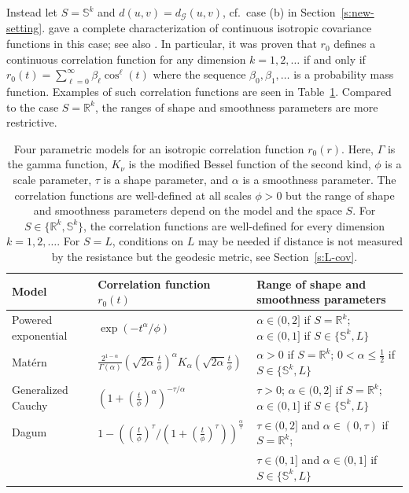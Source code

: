 \documentclass[alpha-refs]{wiley-article}
\begin{document}
Instead let $S=\mathbb S^k$ and $d(u,v)=d_\mathcal{G}(u,v)$, cf.\ case (b) in Section~\ref{s:new-setting}. \citet{Schoenberg} gave a complete characterization of continuous isotropic covariance functions in this case; see also \citet{gneiting2013strictly}. In particular, it was proven that $r_0$ defines a continuous correlation function for any dimension $k=1,2,\ldots$ if and only if $r_0(t)=\sum_{\ell=0}^\infty\beta_\ell\cos^\ell(t)$ where the sequence $\beta_0,\beta_1,\ldots$ is a probability mass function. Examples of such correlation functions are seen in Table~\ref{tab:covariances-sphere}. Compared to the case $S=\mathbb R^k$, the ranges of shape and smoothness parameters are more restrictive.


\begin{table}
    \centering
    \begin{tabular}{l||l|l}
        Model & Correlation function $r_0(t)$ & Range of shape and smoothness parameters\\
        \hline
        \hline
        Powered exponential & $\exp\left(-t^\alpha/\phi\right)$ & $\alpha\in(0,2]$ if $S=\mathbb R^k$; $\alpha\in(0,1]$ if $S\in\{\mathbb S^k,L\}$\\
        Mat{\'e}rn & $\frac{2^{1-\alpha}}{\Gamma(\alpha)}\left( \sqrt{2\alpha}\frac{t}{\phi} \right)^{\alpha} K_{\alpha}\left(\sqrt{2\alpha}\frac{t}{\phi}\right)$ &  $\alpha>0$  if $S=\mathbb R^k$; $0< \alpha\leq \frac{1}{2}$ if $S\in\{\mathbb S^k,L\}$\\
        Generalized Cauchy & $(1 + (\frac{t}{\phi})^{\alpha})^{-\tau/\alpha}$ & $\tau > 0$; $\alpha \in (0,2]$ if $S=\mathbb R^k$; $\alpha \in (0,1]$ if $S\in\{\mathbb S^k,L\}$\\
        Dagum & $1 - ((\frac{t}{\phi})^{\tau}/(1+(\frac{t}{\phi})^{\tau}))^{\frac{\alpha}{\tau}}$ & $\tau \in (0,2]$ and $\alpha \in (0,\tau)$ if $S=\mathbb R^k$; \\
        & & $\tau \in (0,1]$ and $\alpha \in (0,1]$ if $S\in\{\mathbb S^k,L\}$
    \end{tabular}
    \caption{Four parametric models for an isotropic correlation function $r_0(r)$. Here, $\Gamma$ is the gamma function, $K_{\nu}$ is the modified Bessel function of the second kind, $\phi$ is a scale parameter, $\tau$ is a 
shape parameter, and $\alpha$ is a smooth\-ness parameter. The correlation functions are well-defined at all scales $\phi>0$ but the range of shape and smoothness parameters depend on the model and the space $S$. For $S\in\{\mathbb R^k,\mathbb S^k\}$, the correlation functions are well-defined for every dimension $k=1,2,\ldots$. For $S=L$, conditions on $L$ may be needed if distance is not measured by the resistance but the geodesic metric, see Section~\ref{s:L-cov}.
    } 
    \label{tab:covariances-sphere}
\end{table}
\end{document}
